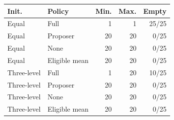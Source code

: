 \begin{tabular}{llrrr}
\toprule
Init. & Policy & Min. & Max. & Empty \\
\midrule
Equal & Full & 1 & 1 & 25/25 \\
Equal & Proposer & 20 & 20 & 0/25 \\
Equal & None & 20 & 20 & 0/25 \\
Equal & Eligible mean & 20 & 20 & 0/25 \\
Three-level & Full & 1 & 20 & 10/25 \\
Three-level & Proposer & 20 & 20 & 0/25 \\
Three-level & None & 20 & 20 & 0/25 \\
Three-level & Eligible mean & 20 & 20 & 0/25 \\
\bottomrule
\end{tabular}